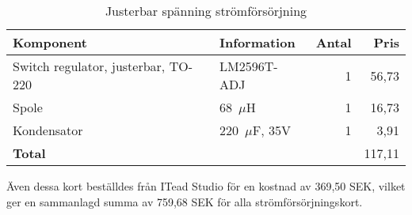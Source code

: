 \begin{table}[htbp!]
\centering
\caption{Justerbar spänning strömförsörjning}
\begin{tabular}{|l|l|r|r|}
\hline
\textbf{Komponent} & \textbf{Information} & \textbf{Antal} & \textbf{Pris} \\
\hline
Switch regulator, justerbar, TO-220  & LM2596T-ADJ  & 1 & 56,73 \\ 
\hline
Spole  & 68~$\mu$H & 1 & 16,73 \\ 
\hline
Kondensator & 220~$\mu$F, 35V  & 1 & 3,91 \\ 
\hline
\textbf{Total} &  & \multicolumn{1}{l|}{} & 117,11 \\ 
\hline
\end{tabular}
\label{justerbar}
\end{table}

Även dessa kort beställdes från ITead Studio för en kostnad av 369,50 SEK, vilket ger en sammanlagd summa av 759,68 SEK för alla strömförsörjningskort.



